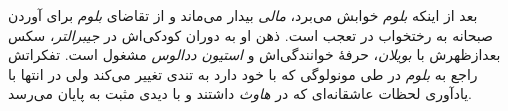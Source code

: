 \documentclass[12pt]{book}
\newcommand{\noun}[1]{\textit{\textcolor{black!70}{#1}}}
\begin{document}
    بعد از اینکه \noun{بلوم} خوابش می‌برد، \noun{مالی} بیدار می‌ماند و از تقاضای \noun{بلوم} برای آوردن صبحانه به رختخواب در تعجب است. ذهن او به دوران کودکی‌اش در \noun{جیبرالتر}، سکس بعدازظهرش با \noun{بویلان}، حرفۀ خوانندگی‌اش و \noun{استیون ددالوس} مشغول است. تفکراتش راجع به \noun{بلوم} در طی مونولوگی که با خود دارد به تندی تغییر می‌کند ولی در انتها با یادآوری لحظات عاشقانه‌ای که در \noun{هاوث} داشتند و با دیدی مثبت به پایان می‌رسد.
\end{document}
